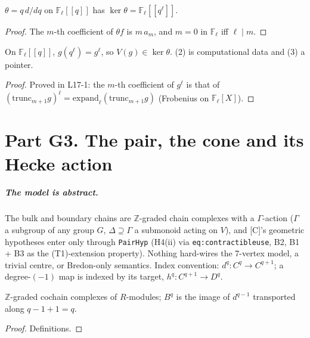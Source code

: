 \begin{lemma}\label{rmk:thetaforms}
  \leanok
  $\theta=q\,d/dq$ on $\mathbb F_\ell[[q]]$ has $\ker\theta=\mathbb F_\ell[[q^\ell]]$.
\end{lemma}
\begin{proof}
  \leanok
  The $m$-th coefficient of $\theta f$ is $m\,a_m$, and $m=0$ in $\mathbb F_\ell$ iff $\ell\mid m$.
\end{proof}

\begin{lemma}[$V(g)=g^\ell$]\label{rmk:thetaforms-frobenius}
  \leanok
  On $\mathbb F_\ell[[q]]$, $g(q^\ell)=g^\ell$, so $V(g)\in\ker\theta$. (2) is computational data and (3) a pointer.
\end{lemma}
\begin{proof}
  \leanok
  Proved in L17-1: the $m$-th coefficient of $g^\ell$ is that of $(\mathrm{trunc}_{m+1}g)^\ell=\mathrm{expand}_\ell(\mathrm{trunc}_{m+1}g)$
  (Frobenius on $\mathbb F_\ell[X]$).
\end{proof}

\chapter{Part G3. The pair, the cone and its Hecke action}\label{ch:cone}

\paragraph{The model is abstract.} The bulk and boundary chains are $\mathbb Z$-graded chain complexes with a $\Gamma$-action
($\Gamma$ a subgroup of any group $G$, $\Delta\supseteq\Gamma$ a submonoid acting on $V$), and [C]'s geometric hypotheses enter
only through \texttt{PairHyp} (H4(ii) via \texttt{eq:contractibleuse}, B2, B1 + B3 as the (T1)-extension property). Nothing
hard-wires the 7-vertex model, a trivial centre, or Bredon-only semantics. Index convention: $d^q\colon C^q\to C^{q+1}$; a
degree-$(-1)$ map is indexed by its target, $h^q\colon C^{q+1}\to D^q$.

\begin{definition}\label{inf:cochaincx}
  \leanok
  $\mathbb Z$-graded cochain complexes of $R$-modules; $B^q$ is the image of $d^{q-1}$ transported along $q-1+1=q$.
\end{definition}
\begin{proof}
  \leanok
  Definitions.
\end{proof}

